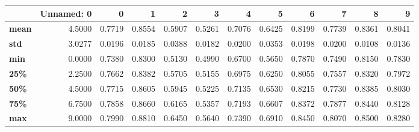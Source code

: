 \begin{tabular}{lrrrrrrrrrrr}
\toprule
{} &  Unnamed: 0 &       0 &       1 &       2 &       3 &       4 &       5 &       6 &       7 &       8 &       9 \\
\midrule
\textbf{mean} &      4.5000 &  0.7719 &  0.8554 &  0.5907 &  0.5261 &  0.7076 &  0.6425 &  0.8199 &  0.7739 &  0.8361 &  0.8041 \\
\textbf{std } &      3.0277 &  0.0196 &  0.0185 &  0.0388 &  0.0182 &  0.0200 &  0.0353 &  0.0198 &  0.0200 &  0.0108 &  0.0136 \\
\textbf{min } &      0.0000 &  0.7380 &  0.8300 &  0.5130 &  0.4990 &  0.6700 &  0.5650 &  0.7870 &  0.7490 &  0.8150 &  0.7830 \\
\textbf{25\% } &      2.2500 &  0.7662 &  0.8382 &  0.5705 &  0.5155 &  0.6975 &  0.6250 &  0.8055 &  0.7557 &  0.8320 &  0.7972 \\
\textbf{50\% } &      4.5000 &  0.7715 &  0.8605 &  0.5945 &  0.5225 &  0.7135 &  0.6530 &  0.8215 &  0.7730 &  0.8385 &  0.8030 \\
\textbf{75\% } &      6.7500 &  0.7858 &  0.8660 &  0.6165 &  0.5357 &  0.7193 &  0.6607 &  0.8372 &  0.7877 &  0.8440 &  0.8128 \\
\textbf{max } &      9.0000 &  0.7990 &  0.8810 &  0.6450 &  0.5640 &  0.7390 &  0.6910 &  0.8450 &  0.8070 &  0.8500 &  0.8280 \\
\bottomrule
\end{tabular}
